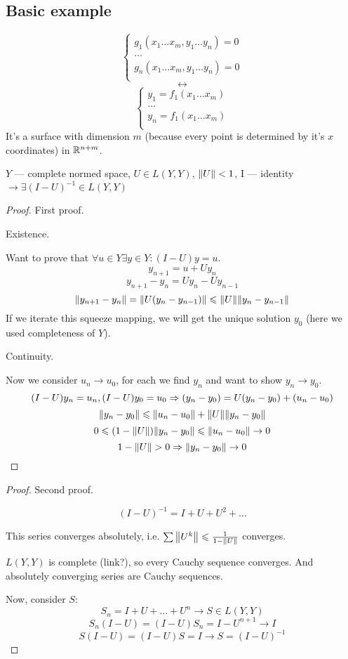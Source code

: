\subsection*{Basic example}
\[ \begin{cases}
    g_1(x_1 \dots x_m, y_1 \dots y_n) = 0\\
    \dots \\
    g_n(x_1 \dots x_m, y_1 \dots y_n) = 0\\
\end{cases} \]
\[ \leftrightarrow \] 
\[ \begin{cases}
    y_1 = f_1(x_1 \dots x_m)\\
    \dots \\
    y_n = f_1(x_1 \dots x_m)\\
\end{cases} \]
It's a surface with dimension $m$ (because every point is determined by it's $x$ coordinates) in $\mathbb R^{n+m}$.

\begin{thr}
$Y$ --- complete normed space, $U \in L(Y, Y)$, $\norm{U} < 1$, I --- identity\\
$ \to \exists (I - U)^{-1} \in L(Y, Y) $
\end{thr}
\begin{proof} First proof.

\par Existence.

Want to prove that $\forall u \in Y \exists y \in Y: (I - U)y =  u$.
\[ y_{n+1} = u + Uy_n \] 
\[ y_{n+1} - y_n = Uy_n - Uy_{n-1} \] 
\[ \norm{ y_{n+1} - y_n } = \norm{U(y_n - y_{n-1})} \leqslant \norm{U}\norm{y_n - y_{n-1}} \] 
If we iterate this squeeze mapping, we will get the unique solution $y_0$ (here we used completeness of $Y$).

\par Continuity.

Now we consider $u_n \to u_0$, for each we find $y_n$ and want to show $y_n \to y_0$.
\[ (I - U)y_n = u_n, (I - U)y_0 = u_0 \Rightarrow (y_n - y_0) = U(y_n - y_0) + (u_n - u_0)\]
\[ \norm{y_n - y_0} \leqslant \norm{u_n - u_0} + \norm{U} \norm{y_n - y_0} \]
\[ 0 \leqslant (1 - \norm{U})\norm{y_n - y_0} \leqslant \norm{u_n - u_0} \to 0 \]
\[ 1 - \norm{U} > 0 \Rightarrow \norm{y_n - y_0} \to 0 \]

\end{proof}

\begin{proof} Second proof. 

\[ (I - U)^{-1} = I + U + U^2 + \dots \] 

This series converges absolutely, i.e. $\sum \norm{U^k} \leqslant \frac{1}{1 - \norm{U}}$ converges.

$L(Y, Y)$ is complete (link?), so every Cauchy sequence converges. And absolutely converging series are Cauchy sequences.

Now, consider $S$:
\[ S_n = I + U + \dots + U^n \to S \in L(Y, Y) \] 
\[ S_n(I - U) = (I - U)S_n = I - U^{n+1} \to I \] 
\[ S(I - U)  = (I - U)S = I \to S = (I - U)^{-1} \]

\end{proof}

